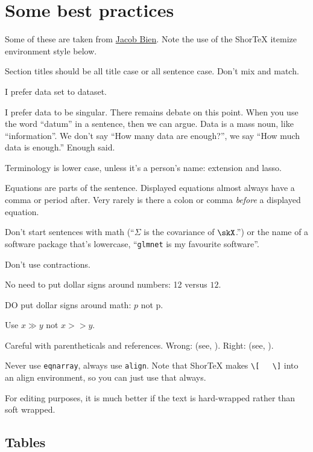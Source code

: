\documentclass[12pt]{article}
\begin{document}
\section{Some best practices}

Some of these are taken from
\href{http://faculty.marshall.usc.edu/Jacob-Bien/papers/manuscript-checklist.pdf}{Jacob
Bien}. Note the use of the ShorTeX itemize environment style below.

\bitem
\item Section titles should be all title case or all sentence case. Don't mix and match.
\item I prefer data set to dataset.
\item I prefer data to be singular. There remains debate on this point. When you
use the word ``datum'' in a sentence, then we can argue. Data is a mass noun,
like ``information''. We don't say ``How many data are enough?'', we say ``How much
data is enough.'' Enough said.  
\item Terminology is lower case, unless it's a person's name: \Nystrom extension
and lasso.
\item Equations are parts of the sentence. Displayed equations almost always
have a comma or period after. Very rarely is there a colon or comma \emph{before}
a displayed equation.
\item Don't start sentences with math (``$\Sigma$ is the covariance of
$\skX$.'') or the name of a software package that's lowercase, \eg
``\texttt{glmnet} is my favourite software''.
\item Don't use contractions.
\item No need to put dollar signs around numbers: 12 versus $12$.
\item DO put dollar signs around math: $p$ not p.
\item Use $x\gg y$ not $x >>y$.
\item Careful with parentheticals and references. Wrong: (see, \eg
\citet{Akaike1973}). Right: (see, \eg \citealp{Akaike1973}).
\item Never use \texttt{eqnarray}, always use \texttt{align}. Note that ShorTeX
makes \verb+\[   \]+ into an align environment, so you can just use that always.
\item For editing purposes, it is much better if the text is hard-wrapped rather
than soft wrapped.
\eitem

\subsection{Tables}
\end{document}
